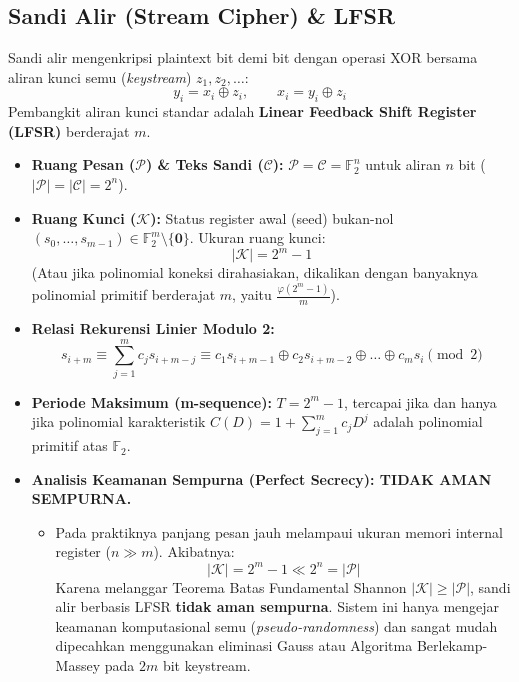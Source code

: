\documentclass[11pt,a4paper]{article}
\begin{document}
\subsection{Sandi Alir (Stream Cipher) \& LFSR}
Sandi alir mengenkripsi plaintext bit demi bit dengan operasi XOR bersama aliran kunci semu (\textit{keystream}) $z_1, z_2, \dots$:
\[
y_i = x_i \oplus z_i, \qquad x_i = y_i \oplus z_i
\]
Pembangkit aliran kunci standar adalah \textbf{Linear Feedback Shift Register (LFSR)} berderajat $m$.
\begin{itemize}[leftmargin=*]
    \item \textbf{Ruang Pesan ($\mathcal{P}$) \& Teks Sandi ($\mathcal{C}$):} $\mathcal{P} = \mathcal{C} = \mathbb{F}_2^n$ untuk aliran $n$ bit ($|\mathcal{P}| = |\mathcal{C}| = 2^n$).
    \item \textbf{Ruang Kunci ($\mathcal{K}$):} Status register awal (seed) bukan-nol $(s_0, \dots, s_{m-1}) \in \mathbb{F}_2^m \setminus \{\mathbf{0}\}$. Ukuran ruang kunci:
    \[
    |\mathcal{K}| = 2^m - 1
    \]
    (Atau jika polinomial koneksi dirahasiakan, dikalikan dengan banyaknya polinomial primitif berderajat $m$, yaitu $\frac{\varphi(2^m - 1)}{m}$).
    \item \textbf{Relasi Rekurensi Linier Modulo 2:}
    \[
    s_{i+m} \equiv \sum_{j=1}^m c_j s_{i+m-j} \equiv c_1 s_{i+m-1} \oplus c_2 s_{i+m-2} \oplus \dots \oplus c_m s_i \pmod 2
    \]
    \item \textbf{Periode Maksimum (m-sequence):} $T = 2^m - 1$, tercapai jika dan hanya jika polinomial karakteristik $C(D) = 1 + \sum_{j=1}^m c_j D^j$ adalah polinomial primitif atas $\mathbb{F}_2$.
    \item \textbf{Analisis Keamanan Sempurna (Perfect Secrecy): TIDAK AMAN SEMPURNA.}
    \begin{itemize}
        \item Pada praktiknya panjang pesan jauh melampaui ukuran memori internal register ($n \gg m$). Akibatnya:
        \[
        |\mathcal{K}| = 2^m - 1 \ll 2^n = |\mathcal{P}|
        \]
        Karena melanggar Teorema Batas Fundamental Shannon $|\mathcal{K}| \ge |\mathcal{P}|$, sandi alir berbasis LFSR \textbf{tidak aman sempurna}. Sistem ini hanya mengejar keamanan komputasional semu (\textit{pseudo-randomness}) dan sangat mudah dipecahkan menggunakan eliminasi Gauss atau Algoritma Berlekamp-Massey pada $2m$ bit keystream.
    \end{itemize}
\end{itemize}
\end{document}
